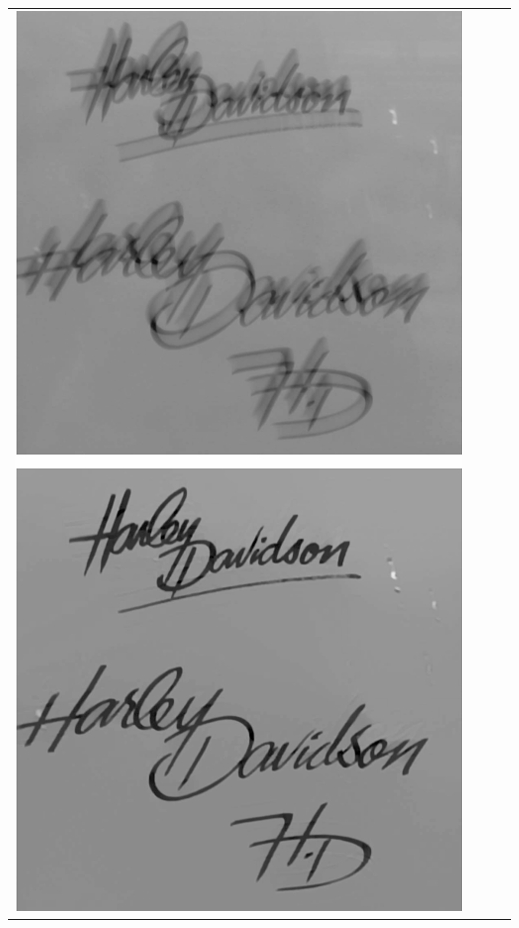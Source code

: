 \documentclass{book}
\begin{document}
\begin{center}
\begin{tabular}{|c|c|c|c|}
        \includegraphics[scale=0.25]{chapter 8/ch8_figure2.jpeg} & 

\end{tabular}
\end{center}
\end{document}

